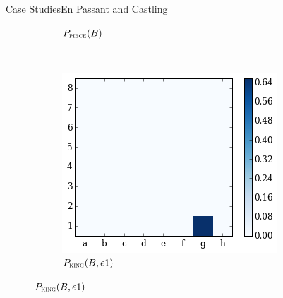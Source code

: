 \documentclass[9pt, unknownkeysallowed]{beamer}
\begin{document}
\begin{frame}{Case Studies}{En Passant and Castling}
\begin{figure}[H]
\begin{subfigure}[t]{0.3\textwidth}
        \caption{$P_{\textsc{piece}}(B)$}
    \end{subfigure}
    ~
  \centering
    \begin{subfigure}[t]{0.3\textwidth}
        \centering
        \includegraphics[width=\textwidth]{../img/best_moves/output_22_6.png}
        \caption{$P_{\textsc{king}}(B, e1)$}
    \end{subfigure}%
\end{figure}
\end{frame}
\end{document}
